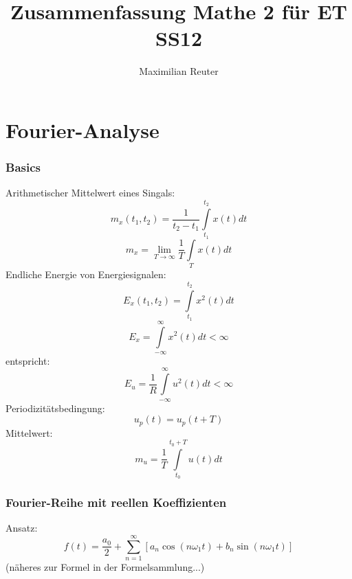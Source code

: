 \documentclass[12pt,a4paper]{article}
\author{Maximilian Reuter}
\title{Zusammenfassung Mathe 2 für ET SS12}
\begin{document}
\maketitle
\tableofcontents
\newpage

\part{Fourier-Analyse}
\section{Basics}
Arithmetischer Mittelwert eines Singals:
\[m_x(t_1,t_2) = \frac{1}{t_2-t_1}\int\limits_{t_1}^{t_2}{x(t)dt}\]
\[m_x = \lim\limits_{T\to\infty}{\frac{1}{T}\int\limits_{T}{x(t)dt}}\]
Endliche Energie von Energiesignalen:
\[E_x(t_1,t_2) = \int\limits_{t_1}^{t_2}{x^2(t)dt}\]
\[E_x = \int\limits_{-\infty}^{\infty}{x^2(t)dt}<\infty\]
entspricht:
\[E_u = \frac{1}{R} \int\limits_{-\infty}^{\infty}{u^2(t)dt} < \infty\]
Periodizitätsbedingung:
\[u_p(t) = u_p(t+T)\]
Mittelwert:
\[m_u = \frac{1}{T}\int\limits_{t_0}^{t_0 + T}{u(t)dt}\]

\section{Fourier-Reihe mit reellen Koeffizienten}
Ansatz:
\[f(t) = \frac{a_0}{2} + \sum\limits_{n=1}^{\infty}{[a_n \cos(n\omega_1 t) + b_n \sin(n \omega_1 t)]}\]
(näheres zur Formel in der Formelsammlung...)
\end{document}
